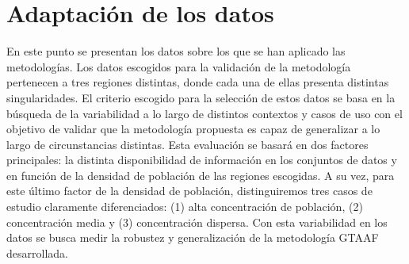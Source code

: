 \documentclass{uathesis-es}
\begin{document}
{%
    
    








\section{Adaptación de los datos}
\label{DATA_PRESENTATION_RESULTS}


En este punto se presentan los datos sobre los que se han aplicado las metodologías. Los datos escogidos para la validación de la metodología pertenecen a tres regiones distintas, donde cada una de ellas presenta distintas singularidades. El criterio escogido para la selección de estos datos se basa en la búsqueda de la variabilidad a lo largo de distintos contextos y casos de uso con el objetivo de validar que la metodología propuesta es capaz de generalizar a lo largo de circunstancias distintas. Esta evaluación se basará en dos factores principales: la distinta disponibilidad de información en los conjuntos de datos y en función de la densidad de población de las regiones escogidas. A su vez, para este último factor de la densidad de población, distinguiremos tres casos de estudio claramente diferenciados: (1) alta concentración de población, (2) concentración media y (3) concentración dispersa. Con esta variabilidad en los datos se busca medir la robustez y generalización de la metodología GTAAF desarrollada.



}
\end{document}
